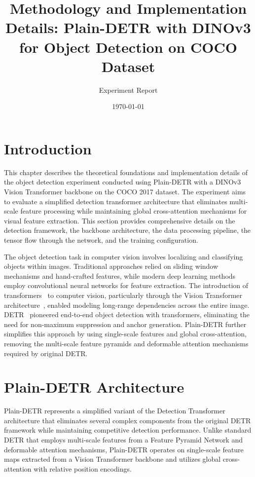 \documentclass[12pt,a4paper]{article}
\title{Methodology and Implementation Details: Plain-DETR with DINOv3 for Object Detection on COCO Dataset}
\author{Experiment Report}
\date{\today}
\begin{document}
\maketitle

\section{Introduction}

This chapter describes the theoretical foundations and implementation details of the object detection experiment conducted using Plain-DETR with a DINOv3 Vision Transformer backbone on the COCO 2017 dataset. The experiment aims to evaluate a simplified detection transformer architecture that eliminates multi-scale feature processing while maintaining global cross-attention mechanisms for visual feature extraction. This section provides comprehensive details on the detection framework, the backbone architecture, the data processing pipeline, the tensor flow through the network, and the training configuration.

The object detection task in computer vision involves localizing and classifying objects within images. Traditional approaches relied on sliding window mechanisms and hand-crafted features, while modern deep learning methods employ convolutional neural networks for feature extraction. The introduction of transformers~\cite{vaswani2017attention} to computer vision, particularly through the Vision Transformer architecture~\cite{dosovitskiy2020image}, enabled modeling long-range dependencies across the entire image. DETR~\cite{carion2020end} pioneered end-to-end object detection with transformers, eliminating the need for non-maximum suppression and anchor generation. Plain-DETR further simplifies this approach by using single-scale features and global cross-attention, removing the multi-scale feature pyramids and deformable attention mechanisms required by original DETR.

\section{Plain-DETR Architecture}

Plain-DETR represents a simplified variant of the Detection Transformer architecture that eliminates several complex components from the original DETR framework while maintaining competitive detection performance. Unlike standard DETR that employs multi-scale features from a Feature Pyramid Network and deformable attention mechanisms, Plain-DETR operates on single-scale feature maps extracted from a Vision Transformer backbone and utilizes global cross-attention with relative position encodings.
\end{document}
